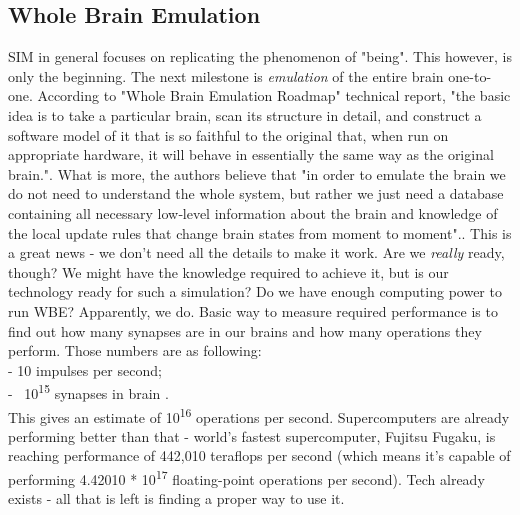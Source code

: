 \documentclass[12pt]{article}
\begin{document}
\subsection{Whole Brain Emulation}
	SIM in general focuses on replicating the phenomenon of "being". This however, is only the beginning. The next milestone is \emph{emulation} of the entire brain one-to-one. According to "Whole Brain Emulation Roadmap" technical report, "the basic idea is to take a particular brain, scan its structure in detail, and construct a software model of it that is so faithful to the original that, when run on appropriate hardware, it will behave in essentially the same way as the original brain."\cite{wbe:2}. What is more, the authors believe that "in order to emulate the brain we do not need to understand the whole system, but rather we just need a database containing all necessary low‐level information about the brain and knowledge of the local update rules that change brain states from moment to moment".\cite{wbe:2}. This is a great news - we don't need all the details to make it work. Are we \emph{really} ready, though? We might have the knowledge required to achieve it, but is our technology ready for such a simulation? Do we have enough computing power to run WBE? Apparently, we do. Basic way to measure required performance is to find out how many synapses are in our brains and how many operations they perform. Those numbers are as following:
	\\- 10 impulses per second;
	\\- ~10\textsuperscript{15} synapses in brain \cite{uploading:3}.\\This gives an estimate of 10\textsuperscript{16} operations per second. Supercomputers are already performing better than that - world's fastest supercomputer, Fujitsu Fugaku, is reaching performance of 442,010 teraflops per second \cite{wikipediaSupercomputer} (which means it's capable of performing 4.42010 * 10\textsuperscript{17} floating-point operations per second). Tech already exists - all that is left is finding a proper way to use it.
\end{document}
